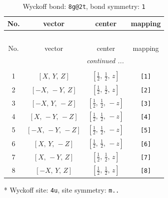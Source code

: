 \documentclass[fleqn,8pt]{jsarticle}
\begin{document}
\begin{longtable}{cccc}
\caption{Wyckoff bond: {\tt 8g@2t}, bond symmetry: {\tt 1}}
 \\
 \hline \hline
No. & vector & center & mapping \\ \hline \endfirsthead

\multicolumn{3}{l}{\tablename\ \thetable{}} \\
 \hline \hline
No. & vector & center & mapping \\ \hline \endhead

 \hline \hline
\multicolumn{3}{r}{\footnotesize\it continued ...} \\ \endfoot

 \hline \hline
\multicolumn{3}{r}{} \\ \endlastfoot

1 & $\left[ X,\, Y,\, Z \right]$ & $\left[ \frac{1}{2},\, \frac{1}{2},\, z \right]$ & {\tt [1]} \\ \hline
2 & $\left[ - X,\, - Y,\, Z \right]$ & $\left[ \frac{1}{2},\, \frac{1}{2},\, z \right]$ & {\tt [2]} \\ \hline
3 & $\left[ - X,\, Y,\, - Z \right]$ & $\left[ \frac{1}{2},\, \frac{1}{2},\, - z \right]$ & {\tt [3]} \\ \hline
4 & $\left[ X,\, - Y,\, - Z \right]$ & $\left[ \frac{1}{2},\, \frac{1}{2},\, - z \right]$ & {\tt [4]} \\ \hline
5 & $\left[ - X,\, - Y,\, - Z \right]$ & $\left[ \frac{1}{2},\, \frac{1}{2},\, - z \right]$ & {\tt [5]} \\ \hline
6 & $\left[ X,\, Y,\, - Z \right]$ & $\left[ \frac{1}{2},\, \frac{1}{2},\, - z \right]$ & {\tt [6]} \\ \hline
7 & $\left[ X,\, - Y,\, Z \right]$ & $\left[ \frac{1}{2},\, \frac{1}{2},\, z \right]$ & {\tt [7]} \\ \hline
8 & $\left[ - X,\, Y,\, Z \right]$ & $\left[ \frac{1}{2},\, \frac{1}{2},\, z \right]$ & {\tt [8]} \\
\end{longtable}
* Wyckoff site: {\tt 4u}, site symmetry: {\tt m..}
\renewcommand{\arraystretch}{1.2}
\end{document}
